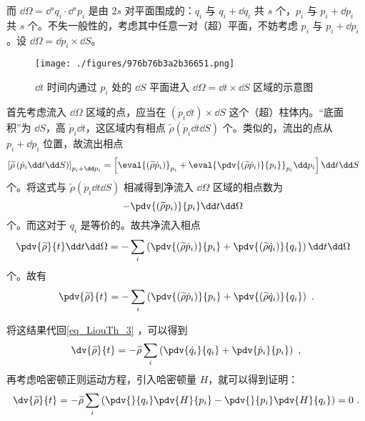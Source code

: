 而 $\dd \Omega = \dd{}^s q_i \cdot \dd{}^s p_i$ 是由 $2s$ 对平面围成的：$q_i$ 与 $q_i + \dd q_i$ 共 $s$ 个，$p_i$ 与 $p_i + \dd p_i$ 共 $s$ 个。不失一般性的，考虑其中任意一对（超）平面，不妨考虑 $p_i$ 与 $p_i+\dd p_i$ 。设 $\dd \Omega = \dd p_i \times \dd S$。
\begin{figure}[ht]
\centering
\texttt{[image: ./figures/976b76b3a2b36651.png]}
\caption{$\dd t$ 时间内通过 $p_i$ 处的 $\dd S$ 平面进入 $\dd \Omega = \dd t \times \dd S$ 区域的示意图} \label{fig_LiouTh_3}
\end{figure}
首先考虑流入 $\dd \Omega$ 区域的点，应当在 $\left(\dot p_i \dd t\right) \times \dd S$ 这个（超）柱体内。“底面积”为 $\dd S$，高 $\dot p_i \dd t$，这区域内有相点 $\widetilde \rho \left(\dot p_i \dd t \dd S \right)$ 个。类似的，流出的点从 $p_i + \dd p_i$ 位置，故流出相点
$$
\left[\widetilde \rho \left(\dot p_i \dd t \dd S\right)\right]_{p_i + \dd p_i} = \left[ \eval{\left(\widetilde\rho \dot p_i\right)}_{p_i} + \eval{\pdv{\left(\widetilde\rho \dot p_i\right)}{p_i}}_{p_i} \dd p_i \right] \dd t \dd S ~~
$$
个。将这式与 $\widetilde \rho \left(\dot p_i \dd t \dd S\right)$ 相减得到净流入 $\dd \Omega$ 区域的相点数为
\begin{equation}
- \pdv{\left(\widetilde \rho p_i\right)}{p_i} \dd t \dd \Omega ~~
\end{equation}
个。而这对于 $q_i$ 是等价的。故共净流入相点
\begin{equation}
\pdv{\widetilde \rho}{t} \dd t \dd \Omega = - \sum_{i} \left(\pdv{\left(\widetilde \rho \dot p_i\right)}{p_i} + \pdv{\left(\widetilde \rho \dot q_i\right)}{q_i}\right) \dd t \dd \Omega ~~
\end{equation}
个。故有
\begin{equation}\label{eq_LiouTh_2}
\pdv{\widetilde \rho}{t} = -\sum_{i} \left(\pdv{\left(\widetilde \rho \dot p_i\right)}{p_i} + \pdv{\left(\widetilde \rho \dot q_i\right)}{q_i}\right) ~.
\end{equation}

将这结果代回\autoref{eq_LiouTh_3} ，可以得到
\begin{equation}
\dv{\widetilde \rho}{t} = -\widetilde \rho \sum_{i} \left(\pdv{\dot q_i}{q_i} + \pdv{\dot p_i}{p_i}\right) ~,
\end{equation}
再考虑哈密顿正则运动方程，引入哈密顿量 $H$，就可以得到证明：
\begin{equation}
\dv{\widetilde \rho}{t} = -\widetilde \rho \sum_{i} \left(\pdv{}{q_i} \pdv{H}{p_i} - \pdv{}{p_i} \pdv{H}{q_i}\right) = 0 ~.
\end{equation}


